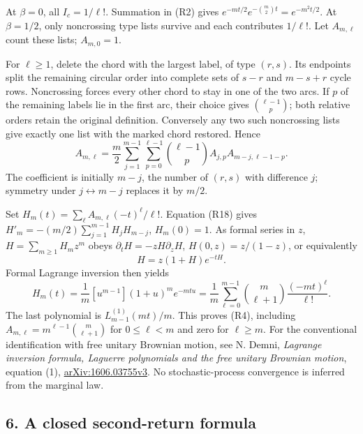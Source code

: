At \(\beta=0\), all \(I_c=1/\ell!\). Summation in (R2) gives
\(e^{-mt/2}e^{-\binom m2 t}=e^{-m^2t/2}\).
At \(\beta=1/2\), only noncrossing type lists survive and each contributes
\(1/\ell!\). Let \(A_{m,\ell}\) count these lists; \(A_{m,0}=1\).

For \(\ell\ge1\), delete the chord with the largest label, of type \((r,s)\).
Its endpoints split the remaining circular order into complete sets of
\(s-r\) and \(m-s+r\) cycle rows. Noncrossing forces every other chord to stay
in one of the two arcs. If \(p\) of the remaining labels lie in the first
arc, their choice gives \(\binom{\ell-1}{p}\); both relative orders retain
the original definition. Conversely any two such noncrossing lists give
exactly one list with the marked chord restored. Hence
\[
 A_{m,\ell}=\frac m2\sum_{j=1}^{m-1}\sum_{p=0}^{\ell-1}
       \binom{\ell-1}{p}A_{j,p}A_{m-j,\ell-1-p}.               \tag{R18}
\]
The coefficient is initially \(m-j\), the number of \((r,s)\) with difference
\(j\); symmetry under \(j\leftrightarrow m-j\) replaces it by \(m/2\).

Set \(H_m(t)=\sum_\ell A_{m,\ell}(-t)^\ell/\ell!\).
Equation (R18) gives \(H'_m=-(m/2)\sum_{j=1}^{m-1}H_jH_{m-j}\),
\(H_m(0)=1\). As formal series in \(z\), \(H=\sum_{m\ge1}H_mz^m\) obeys
\(\partial_tH=-zH\partial_zH\), \(H(0,z)=z/(1-z)\), or equivalently
\[
 H=z(1+H)e^{-tH}.
\]
Formal Lagrange inversion then yields
\[
 H_m(t)=\frac1m[u^{m-1}](1+u)^m e^{-mtu}
   =\frac1m\sum_{\ell=0}^{m-1}\binom m{\ell+1}
                           \frac{(-mt)^\ell}{\ell!}.
                                                               \tag{R19}
\]
The last polynomial is \(L_{m-1}^{(1)}(mt)/m\). This proves (R4),
including \(A_{m,\ell}=m^{\ell-1}\binom m{\ell+1}\) for
\(0\le\ell<m\) and zero for \(\ell\ge m\).
For the conventional identification with free unitary Brownian motion,
see N. Demni, \emph{Lagrange inversion formula, Laguerre polynomials and the
free unitary Brownian motion}, equation (1),
\href{https://arxiv.org/pdf/1606.03755v3}{arXiv:1606.03755v3}.
No stochastic-process convergence is inferred from the marginal law.

\hypertarget{harmonic-returns-a-closed-second-return-formula}{%
\subsection{6. A closed second-return formula}\label{harmonic-returns-a-closed-second-return-formula}}

